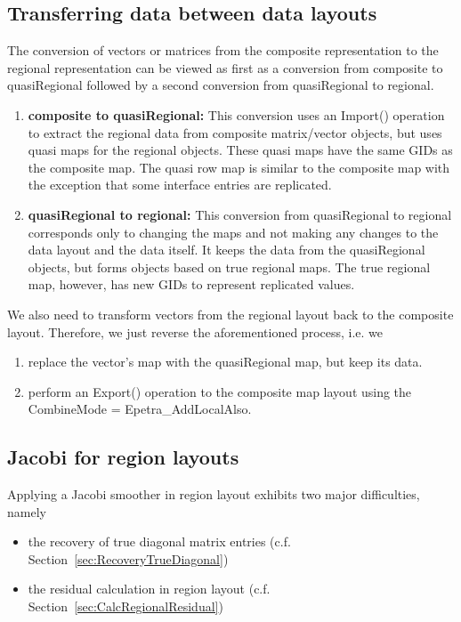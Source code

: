 \documentclass[11pt]{article}
\begin{document}
\subsection{Transferring data between data layouts}
\label{sec:TransferDataLayouts}

The conversion of vectors or matrices from the
composite representation to the regional representation can be viewed as
first as a conversion from composite to quasiRegional  followed by
a second conversion from quasiRegional to regional.
\begin{enumerate}
 \item {\bf composite to quasiRegional:} This conversion uses an {\sf Import()} operation
 to extract the regional data from composite matrix/vector objects, but uses quasi maps
 for the regional objects. These quasi maps have the same GIDs
 as the composite map. The quasi row map is similar to the composite
 map with the exception that some interface entries are replicated.
 \item {\bf quasiRegional to regional:} This conversion from quasiRegional to regional corresponds
 only to changing the maps and not making any changes to the data layout and the data itself.
 It keeps the data from the quasiRegional objects,
 but forms objects based on true regional maps.
 The true regional map, however, has new GIDs to represent replicated values.
\end{enumerate}
We also need to transform vectors from the regional layout back to the composite layout. Therefore, we just reverse the aforementioned process, i.e. we
\begin{enumerate}
 \item replace the vector's map with the quasiRegional map, but keep its data.
 \item perform an {\sf Export()} operation to the composite map layout using the {\sf CombineMode = Epetra\_AddLocalAlso}.
\end{enumerate}

\subsection{Jacobi for region layouts}
\label{sec:RegionJacobi}

Applying a Jacobi smoother in region layout exhibits two major difficulties, namely
\begin{itemize}
\item the recovery of true diagonal matrix entries (c.f. Section~\ref{sec:RecoveryTrueDiagonal})
\item the residual calculation in region layout (c.f. Section~\ref{sec:CalcRegionalResidual})
\end{itemize}
\end{document}

